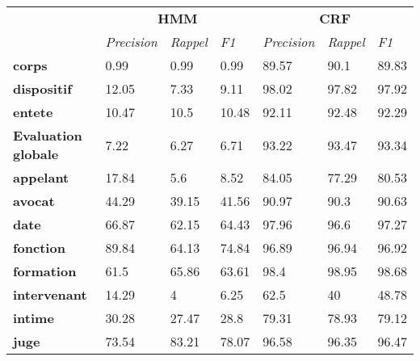 \begin{table}[!h]
	\scriptsize
	\centering
	\begin{tabular}{|l|l|l|l|l|l|l|}
		\hline
	\multirow{2}{*}{}	& \multicolumn{3}{c}{\textbf{HMM}}  &      \multicolumn{3}{|c|}{\textbf{CRF}}          \\ \cline{2-7}
		& \textit{Precision} & \textit{Rappel} & \textit{F1} & \textit{Precision} & \textit{Rappel} & \textit{F1} \\ \hline
		\textbf{corps}         & 0.99               & 0.99            & 0.99        & 89.57              & 90.1            & 89.83       \\ 
		\textbf{dispositif}    & 12.05              & 7.33            & 9.11        & 98.02              & 97.82           & 97.92       \\ 
		\textbf{entete}        & 10.47              & 10.5            & 10.48       & 92.11              & 92.48           & 92.29       \\ \hline
		\textbf{Evaluation globale} & 7.22               & 6.27            & 6.71        & 93.22              & 93.47           & 93.34       \\ \hline
				\noalign{\smallskip}\hline\noalign{\smallskip}
		\textbf{appelant}      & 17.84              & 5.6             & 8.52        & 84.05              & 77.29           & 80.53       \\ 
		\textbf{avocat}        & 44.29              & 39.15           & 41.56       & 90.97              & 90.3            & 90.63       \\ 
		\textbf{date}          & 66.87              & 62.15           & 64.43       & 97.96              & 96.6            & 97.27       \\ 
		\textbf{fonction}      & 89.84              & 64.13           & 74.84       & 96.89              & 96.94           & 96.92       \\ 
		\textbf{formation}     & 61.5               & 65.86           & 63.61       & 98.4               & 98.95           & 98.68       \\ 
		\textbf{intervenant}   & 14.29              & 4               & 6.25        & 62.5               & 40              & 48.78       \\ 
		\textbf{intime}        & 30.28              & 27.47           & 28.8        & 79.31              & 78.93           & 79.12       \\ 
		\textbf{juge}          & 73.54              & 83.21           & 78.07       & 96.58              & 96.35           & 96.47       \\ 

\end{tabular}
\end{table}
